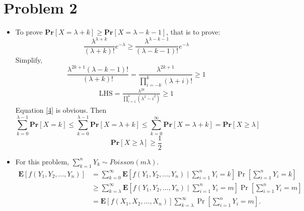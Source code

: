 \documentclass{article}
\theoremstyle{definition}
\begin{document}
	\section*{Problem 2}
	\begin{itemize}
		\item 
		To prove $\mathbf{Pr}[X=\lambda+k]\geq \mathbf{Pr}[X=\lambda-k-1]$, that is to prove:
		\begin{equation}
			\frac{\lambda^{\lambda+k}}{(\lambda+k)!}e^{-\lambda} \geq \frac{\lambda^{\lambda-k-1}}{(\lambda-k-1)!}e^{-\lambda}
		\end{equation}
		Simplify, 
		\begin{equation}
			\frac{\lambda^{2k+1}(\lambda-k-1)!}{(\lambda+k)!} = \frac{\lambda^{2k+1}}{\prod_{i=-k}^{k}(\lambda+i)!} \geq 1
		\end{equation}
		\begin{equation}
			\begin{aligned}
				\text{LHS} = \frac{\lambda^{2k}}{\prod_{i=1}^{k}(\lambda^2-i^2)} \geq 1
			\end{aligned}
			\label{4}
		\end{equation}
		Equation \ref{4} is obvious. Then 
		\begin{equation}
			\sum_{k = 0}^{\lambda-1}\mathbf{Pr}[X = k] \leq \sum_{k = 0}^{\lambda-1}\mathbf{Pr}[X = \lambda+k] \leq \sum_{k = 0}^{\infty}\mathbf{Pr}[X = \lambda+k] = \mathbf{Pr}[X \geq \lambda]
		\end{equation}	
		\begin{equation}
			\mathbf{Pr}[X \geq \lambda] \geq \frac{1}{2}
		\end{equation}
		\item For this problem, $\sum_{k=1}^n Y_k \sim Poisson(m\lambda)$. 
		\begin{equation}
		\begin{aligned}
			\mathbf{E}\left[f\left(Y_1, Y_2, \ldots, Y_n\right)\right] & =\sum_{k=0}^{\infty} \mathbf{E}\left[f\left(Y_1, Y_2, \ldots, Y_n\right) \mid \sum_{i=1}^n Y_i=k\right] \operatorname{Pr}\left[\sum_{i=1}^n Y_i=k\right] \\
			& \geq \sum_{k=\lambda}^{\infty}\mathbf{E}\left[f\left(Y_1, Y_2, \ldots, Y_n\right) \mid \sum_{i=1}^n Y_i=m\right] \operatorname{Pr}\left[\sum_{i=1}^n Y_i=m\right] \\
			& =\mathbf{E}\left[f\left(X_1, X_2, \ldots, X_n\right)\right]\sum_{k=\lambda}^{\infty} \operatorname{Pr}\left[\sum_{i=1}^n Y_i=m\right].
		\end{aligned}
		\end{equation}

\end{itemize}
\end{document}
